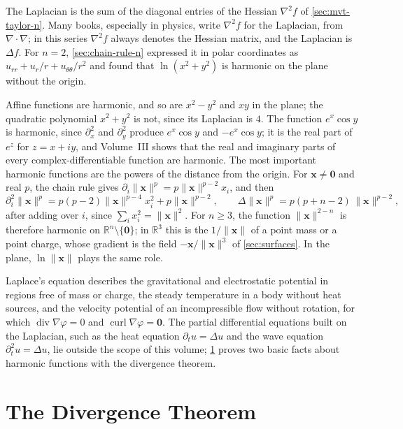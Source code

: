 The Laplacian is the sum of the diagonal entries of the Hessian $\nabla^2f$ of \cref{sec:mvt-taylor-n}. Many books, especially in physics, write $\nabla^2f$ for the Laplacian, from $\nabla\cdot\nabla$; in this series $\nabla^2f$ always denotes the Hessian matrix, and the Laplacian is $\Delta f$. For $n=2$, \cref{sec:chain-rule-n} expressed it in polar coordinates as $u_{rr}+u_r/r+u_{\theta\theta}/r^2$ and found that $\ln(x^2+y^2)$ is harmonic on the plane without the origin.

Affine functions are harmonic, and so are $x^2-y^2$ and $xy$ in the plane; the quadratic polynomial $x^2+y^2$ is not, since its Laplacian is $4$. The function $e^x\cos y$ is harmonic, since $\partial_x^2$ and $\partial_y^2$ produce $e^x\cos y$ and $-e^x\cos y$; it is the real part of $e^z$ for $z=x+iy$, and Volume~III shows that the real and imaginary parts of every complex-differentiable function are harmonic. The most important harmonic functions are the powers of the distance from the origin. For $\mathbf x\ne\mathbf0$ and real $p$, the chain rule gives $\partial_i\|\mathbf x\|^p=p\|\mathbf x\|^{p-2}x_i$, and then
\[
\partial_i^2\|\mathbf x\|^p=p(p-2)\|\mathbf x\|^{p-4}x_i^2+p\|\mathbf x\|^{p-2},\qquad\Delta\|\mathbf x\|^p=p(p+n-2)\,\|\mathbf x\|^{p-2},
\]
after adding over $i$, since $\sum_ix_i^2=\|\mathbf x\|^2$. For $n\ge3$, the function $\|\mathbf x\|^{2-n}$ is therefore harmonic on $\mathbb R^n\setminus\{\mathbf0\}$; in $\mathbb R^3$ this is the  $1/\|\mathbf x\|$ of a point mass or a point charge, whose gradient is the field $-\mathbf x/\|\mathbf x\|^3$ of \cref{sec:surfaces}. In the plane, $\ln\|\mathbf x\|$ plays the same role.

Laplace's equation describes the gravitational and electrostatic potential in regions free of mass or charge, the steady temperature in a body without heat sources, and the velocity potential of an incompressible flow without rotation, for which $\operatorname{div}\nabla\varphi=0$ and $\operatorname{curl}\nabla\varphi=\mathbf0$. The partial differential equations built on the Laplacian, such as the heat equation $\partial_tu=\Delta u$ and the wave equation $\partial_t^2u=\Delta u$, lie outside the scope of this volume; \cref{sec:divergence-theorem} proves two basic facts about harmonic functions with the divergence theorem.

\section{The Divergence Theorem}
\label{sec:divergence-theorem}


